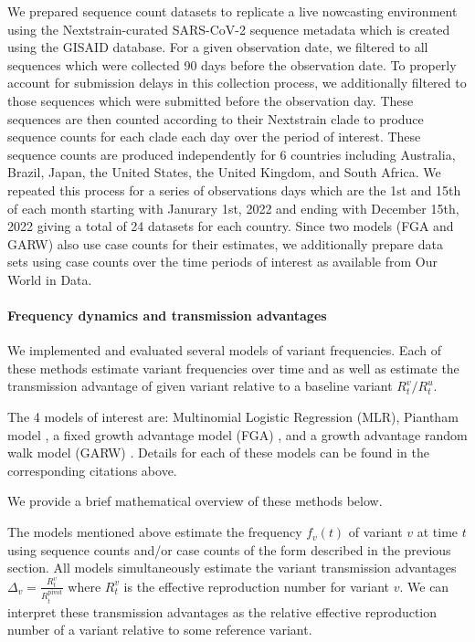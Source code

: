 \documentclass[11pt,oneside,letterpaper]{article}
\begin{document}
We prepared sequence count datasets to replicate a live nowcasting environment using the Nextstrain-curated SARS-CoV-2 sequence metadata which is created using the GISAID database.
For a given observation date, we filtered to all sequences which were collected 90 days before the observation date.
To properly account for submission delays in this collection process, we additionally filtered to those sequences which were submitted before the observation day.
These sequences are then counted according to their Nextstrain clade to produce sequence counts for each clade each day over the period of interest.
These sequence counts are produced independently for 6 countries including Australia, Brazil, Japan, the United States, the United Kingdom, and South Africa.
We repeated this process for a series of observations days which are the 1st and 15th of each month starting with  Janurary 1st, 2022 and ending with December 15th, 2022 giving a total of 24 datasets for each country.
Since two models (FGA and GARW) also use case counts for their estimates, we additionally prepare data sets using case counts over the time periods of interest as available from Our World in Data.

\paragraph{Frequency dynamics and transmission advantages}%

We implemented and evaluated several models of variant frequencies.
Each of these methods estimate variant frequencies over time and as well as estimate the transmission advantage of given variant relative to a baseline variant $R_{t}^{v} / R_{t}^{u}$.

The 4 models of interest are: Multinomial Logistic Regression (MLR), Piantham model \cite{piantham2021estimating}, a fixed growth advantage model (FGA)  \cite{figgins2022sars}, and a growth advantage random walk model (GARW)  \cite{figgins2022sars}.
Details for each of these models can be found in the corresponding citations above.

We provide a brief mathematical overview of these methods below.

The models mentioned above estimate the frequency  $f_{v}(t)$ of variant $v$ at time $t$ using sequence counts and/or case counts of the form described in the previous section.
All models simultaneously estimate the variant transmission advantages $\Delta_{v} = \frac{R_{t}^{v}}{R_{t}^{\text{pivot}}}$ where $R_{t}^{v}$ is the effective reproduction number for variant $v$.
We can interpret these transmission advantages as the relative effective reproduction number of a variant relative to some reference variant.
\end{document}
